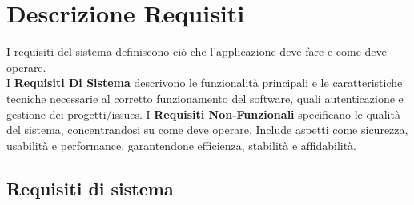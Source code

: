 \chapter{Descrizione Requisiti}
I requisiti del sistema definiscono ciò che l’applicazione deve fare e come deve operare.\\
I \textbf{Requisiti Di Sistema} descrivono le funzionalità principali e le caratteristiche tecniche necessarie al corretto funzionamento del software, quali autenticazione e gestione dei progetti/issues.\newline
I \textbf{Requisiti Non-Funzionali} specificano le qualità del sistema, concentrandosi su come deve operare. Include aspetti come sicurezza, usabilità e performance, garantendone efficienza, stabilità e affidabilità.
\section{Requisiti di sistema}
